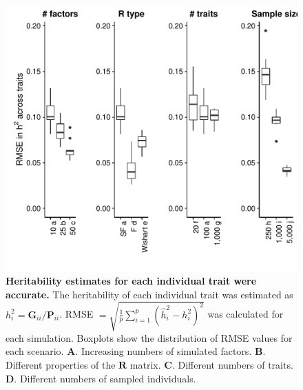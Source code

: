 \documentclass[12pt,titlepage]{article}
\begin{document}
\begin{figure}[b]
\begin{center}
\includegraphics[width=5in]{Figures/RMSE.pdf}
\caption[Error in trait heritability]{ \textbf{Heritability estimates for each individual trait were accurate.} The heritability of each individual trait was estimated as $h^2_i = \mathbf{G}_{ii}/\mathbf{P}_{ii}$. RMSE $= \sqrt{\frac{1}{p}\sum\limits_{i=1}^p(\hat{h}^2_i - h^2_i)^2}$ was calculated for each simulation. Boxplots show the distribution of RMSE values for each scenario. \textbf{A}. Increasing numbers of simulated factors. \textbf{B}. Different properties of the $\mathbf{R}$ matrix. \textbf{C}. Different numbers of traits. \textbf{D}. Different numbers of sampled individuals. }
\label{fig:trait_h2s}
\end{center}
\end{figure}
\end{document}
